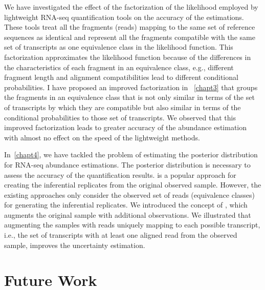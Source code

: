 We have investigated the effect of the factorization of the likelihood employed
by lightweight RNA-seq quantification tools on the accuracy of the estimations. These tools
treat all the fragments (reads) mapping to the same set of reference sequences as identical
and represent all the fragments compatible with the same set of transcripts as one equivalence class 
in the likelihood function.
This factorization approximates the likelihood function because of the differences in the
characteristics of each fragment in an equivalence class, e.g., different fragment length and alignment 
compatibilities lead to different conditional probabilities.
I have proposed an improved factorization in ~\cref{chapt3} that groups the fragments
in an equivalence class that is not only similar in terms of the set of transcripts by which they are 
compatible but also similar in terms of the conditional probabilities to those
set of transcripts. We observed that this improved factorization leads to greater accuracy of
the abundance estimation with almost no effect on the speed of the lightweight methods.
 
In~\cref{chapt4}, we have tackled the problem of estimating the posterior distribution for
RNA-seq abundance estimations. The posterior distribution is necessary to assess the accuracy
of the quantification results. \boots is a popular approach for creating the inferential replicates
from the original observed sample. However, the existing \boot approaches only consider the observed
set of reads (equivalence classes) for generating the inferential replicates. We introduced the
concept of \aboots, which augments the original sample with additional observations. We illustrated 
that augmenting the \boot samples with reads uniquely mapping to each possible transcript, i.e., the
set of transcripts with at least one aligned read from the observed sample, improves the uncertainty 
estimation.
 
\section{Future Work}
 
